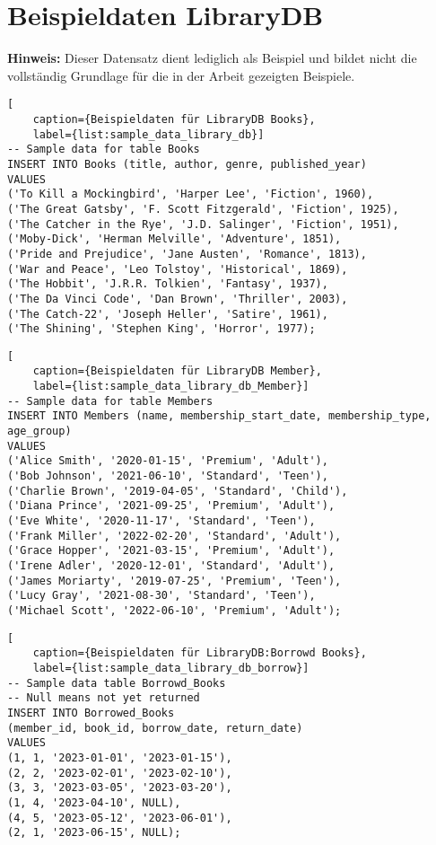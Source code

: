 \section*{Beispieldaten LibraryDB}
\label{sec:library_db_sample_data} \textbf{Hinweis:} Dieser Datensatz dient lediglich
als Beispiel und bildet nicht die vollständig Grundlage für die in der Arbeit gezeigten
Beispiele.

\begin{lstlisting}[
    caption={Beispieldaten für LibraryDB Books},
    label={list:sample_data_library_db}]
-- Sample data for table Books
INSERT INTO Books (title, author, genre, published_year)
VALUES
('To Kill a Mockingbird', 'Harper Lee', 'Fiction', 1960),
('The Great Gatsby', 'F. Scott Fitzgerald', 'Fiction', 1925),
('The Catcher in the Rye', 'J.D. Salinger', 'Fiction', 1951),
('Moby-Dick', 'Herman Melville', 'Adventure', 1851),
('Pride and Prejudice', 'Jane Austen', 'Romance', 1813),
('War and Peace', 'Leo Tolstoy', 'Historical', 1869),
('The Hobbit', 'J.R.R. Tolkien', 'Fantasy', 1937),
('The Da Vinci Code', 'Dan Brown', 'Thriller', 2003),
('The Catch-22', 'Joseph Heller', 'Satire', 1961),
('The Shining', 'Stephen King', 'Horror', 1977);
\end{lstlisting}

\begin{lstlisting}[
    caption={Beispieldaten für LibraryDB Member},
    label={list:sample_data_library_db_Member}]
-- Sample data for table Members
INSERT INTO Members (name, membership_start_date, membership_type, age_group)
VALUES
('Alice Smith', '2020-01-15', 'Premium', 'Adult'),
('Bob Johnson', '2021-06-10', 'Standard', 'Teen'),
('Charlie Brown', '2019-04-05', 'Standard', 'Child'),
('Diana Prince', '2021-09-25', 'Premium', 'Adult'),
('Eve White', '2020-11-17', 'Standard', 'Teen'),
('Frank Miller', '2022-02-20', 'Standard', 'Adult'),
('Grace Hopper', '2021-03-15', 'Premium', 'Adult'),
('Irene Adler', '2020-12-01', 'Standard', 'Adult'),
('James Moriarty', '2019-07-25', 'Premium', 'Teen'),
('Lucy Gray', '2021-08-30', 'Standard', 'Teen'),
('Michael Scott', '2022-06-10', 'Premium', 'Adult');
\end{lstlisting}

\filbreak

\begin{lstlisting}[
    caption={Beispieldaten für LibraryDB:Borrowd Books},
    label={list:sample_data_library_db_borrow}]
-- Sample data table Borrowd_Books
-- Null means not yet returned
INSERT INTO Borrowed_Books
(member_id, book_id, borrow_date, return_date)
VALUES
(1, 1, '2023-01-01', '2023-01-15'),
(2, 2, '2023-02-01', '2023-02-10'),
(3, 3, '2023-03-05', '2023-03-20'),
(1, 4, '2023-04-10', NULL),
(4, 5, '2023-05-12', '2023-06-01'),
(2, 1, '2023-06-15', NULL);
\end{lstlisting}